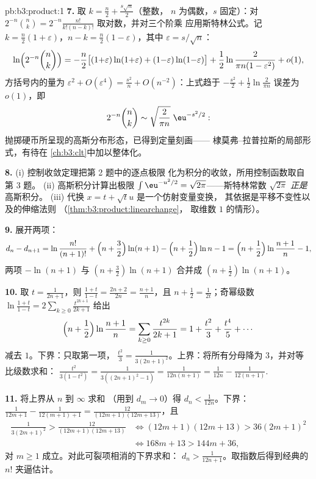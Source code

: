 \begin{solution}{pb:b3:product:1}
\textbf{7.} 取 $k = \frac n2 + \frac{s\sqrt n}2$（整数，
$n$ 为偶数，$s$ 固定）：对 $2^{-n}\binom nk =
2^{-n}\frac{n!}{k!(n-k)!}$ 取对数，并对三个阶乘
应用斯特林公式。记 $k = \frac n2(1 + \varepsilon)$，$n - k =
\frac n2(1 - \varepsilon)$，其中 $\varepsilon = s/\sqrt n$：
\[
\ln\Bigl(2^{-n}\binom nk\Bigr)
= -\frac n2\bigl[(1{+}\varepsilon)\ln(1{+}\varepsilon) +
(1{-}\varepsilon)\ln(1{-}\varepsilon)\bigr]
+ \frac12\ln\frac{2}{\pi n(1 - \varepsilon^2)} + o(1),
\]
方括号内的量为 $\varepsilon^2 + O(\varepsilon^4) =
\frac{s^2}n + O(n^{-2})$：上式趋于 $-\frac{s^2}2 +
\frac12\ln\frac2{\pi n}$ 误差为 $o(1)$，即
\[
2^{-n}\binom nk \sim \sqrt{\frac{2}{\pi
n}}\;\eu^{-s^2/2} :
\]
抛掷硬币所呈现的高斯分布形态，已得到定量刻画——
棣莫弗–拉普拉斯的局部形式，有待在
\cref{ch:b3:clt}中加以整体化。

\textbf{8.} (i) 控制收敛定理把第 2 题中的逐点极限
化为积分的收敛，所用控制函数取自第 3 题。
(ii) 高斯积分计算出极限
$\int\eu^{-u^2/2} = \sqrt{2\pi}$——斯特林常数
$\sqrt{2\pi}$ \emph{正是}高斯积分。
(iii) 代换 $x = t + \sqrt tu$ 是一个仿射变量变换，
其依据是平移不变性以及的伸缩法则
（\cref{thm:b3:product:linearchange}，
取维数 $1$ 的情形）。

\textbf{9.} 展开两项：
\[
d_n - d_{n+1} = \ln\frac{n!}{(n+1)!} + \Bigl(n +
\frac32\Bigr)\ln(n+1) - \Bigl(n + \frac12\Bigr)\ln n - 1
= \Bigl(n + \frac12\Bigr)\ln\frac{n+1}n - 1,
\]
两项 $-\ln(n+1)$ 与 $(n + \frac32)\ln(n+1)$ 合并成
$(n + \frac12)\ln(n+1)$。

\textbf{10.} 取 $t = \frac1{2n+1}$，则 $\frac{1+t}{1-t} =
\frac{2n+2}{2n} = \frac{n+1}n$，且 $n + \frac12 =
\frac1{2t}$；奇幂级数 $\ln\frac{1+t}{1-t} =
2\sum_{k\geq0}\frac{t^{2k+1}}{2k+1}$ 给出
\[
\Bigl(n + \frac12\Bigr)\ln\frac{n+1}n
= \sum_{k\geq0}\frac{t^{2k}}{2k+1}
= 1 + \frac{t^2}3 + \frac{t^4}5 + \cdots
\]
减去 $1$。下界：只取第一项，
$\frac{t^2}3 = \frac1{3(2n+1)^2}$。上界：将所有分母降为
$3$，并对等比级数求和：
$\frac{t^2}{3(1 - t^2)} = \frac1{3((2n+1)^2 - 1)} =
\frac1{12n(n+1)} = \frac1{12n} - \frac1{12(n+1)}$.

\textbf{11.} 将上界从 $n$ 到 $\infty$ 求和
（用到 $d_m \to 0$）得 $d_n < \frac1{12n}$。下界：
$\frac1{12m+1} - \frac1{12(m+1)+1} =
\frac{12}{(12m+1)(12m+13)}$，且
\begin{align*}
\frac1{3(2m+1)^2} > \frac{12}{(12m+1)(12m+13)}
&\iff (12m+1)(12m+13) > 36(2m+1)^2 \\
&\iff 168m + 13 > 144m + 36,
\end{align*}
对 $m \geq 1$ 成立。对此可裂项相消的下界求和：
$d_n > \frac1{12n+1}$。取指数后得到经典的
$n!$ 夹逼估计。


\end{solution}

